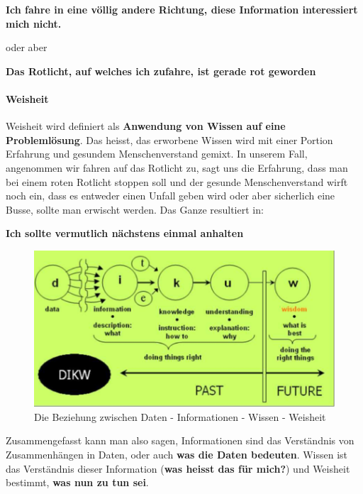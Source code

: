 \documentclass[a4paper, 11pt, nofootinbib]{article}
\begin{document}
\begin{center}
\textbf{	Ich fahre in eine völlig andere Richtung, diese Information interessiert mich nicht.}
\end{center}

oder aber

\begin{center}
\textbf{	Das Rotlicht, auf welches ich zufahre, ist gerade rot geworden}
\end{center}

\paragraph{Weisheit}
Weisheit wird definiert als \textbf{Anwendung von Wissen auf eine Problemlösung}. Das heisst, das erworbene Wissen wird mit einer Portion Erfahrung und gesundem Menschenverstand gemixt. In unserem Fall, angenommen wir fahren auf das Rotlicht zu, sagt uns die Erfahrung, dass man bei einem roten Rotlicht stoppen soll und der gesunde Menschenverstand wirft noch ein, dass es entweder einen Unfall geben wird oder aber sicherlich eine Busse, sollte man erwischt werden. Das Ganze resultiert in:

\begin{center}
\textbf{	Ich sollte vermutlich nächstens einmal anhalten}
\end{center}

\vspace*{20px}

\begin{figure}[htb]
	\centering
	\includegraphics[keepaspectratio=true,height=15\baselineskip]{DIKW.PNG}
	\caption{Die Beziehung zwischen Daten - Informationen - Wissen - Weisheit}
	\label{fig:DIKW}
\end{figure}

Zusammengefasst kann man also sagen, Informationen sind das Verständnis von Zusammenhängen in Daten, oder auch \textbf{was die Daten bedeuten}. Wissen ist das Verständnis dieser Information (\textbf{was heisst das für mich?}) und Weisheit bestimmt, \textbf{was nun zu tun sei}. 
\newpage
\end{document}
